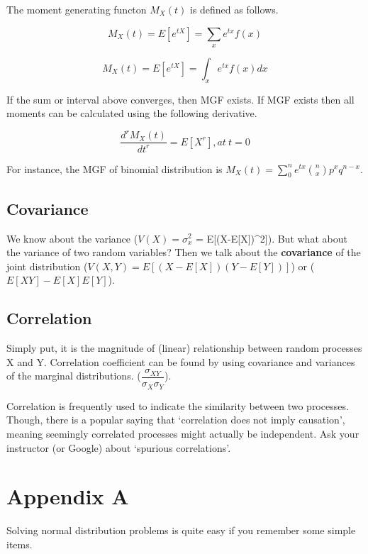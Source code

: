 \documentclass[]{book}
\theoremstyle{definition}
\theoremstyle{definition}
\theoremstyle{definition}
\theoremstyle{remark}
\begin{document}
The moment generating functon \(M_X(t)\) is defined as follows.

\[M_X(t) = E[e^{tX}] = \sum_x e^{tx} f(x)\]

\[M_X(t) = E[e^{tX}] = \int_x e^{tx} f(x) dx\]

If the sum or interval above converges, then MGF exists. If MGF exists
then all moments can be calculated using the following derivative.

\[\dfrac{d^rM_X(t)}{dt^r} = E[X^r], at\ t=0\]

For instance, the MGF of binomial distribution is
\(M_X(t) = \sum_0^n e^{tx} \binom{n}{x}p^xq^{n-x}\).

\hypertarget{covariance}{%
\section{Covariance}\label{covariance}}

We know about the variance (\(V(X) = \sigma_x^2\) =
E{[}(X-E{[}X{]})\^{}2{]}). But what about the variance of two random
variables? Then we talk about the \textbf{covariance} of the joint
distribution (\(V(X,Y) = E[(X-E[X])(Y-E[Y])]\)) or
(\(E[XY] - E[X]E[Y]\)).

\hypertarget{correlation}{%
\section{Correlation}\label{correlation}}

Simply put, it is the magnitude of (linear) relationship between random
processes X and Y. Correlation coefficient can be found by using
covariance and variances of the marginal distributions.
(\(\dfrac{\sigma_{XY}}{\sigma_X\sigma_Y}\)).

Correlation is frequently used to indicate the similarity between two
processes. Though, there is a popular saying that `correlation does not
imply causation', meaning seemingly correlated processes might actually
be independent. Ask your instructor (or Google) about `spurious
correlations'.

\hypertarget{appendix-appendix}{%
\appendix}


\hypertarget{appendix-a}{%
\chapter{Appendix A}\label{appendix-a}}

Solving normal distribution problems is quite easy if you remember some
simple items.
\end{document}
